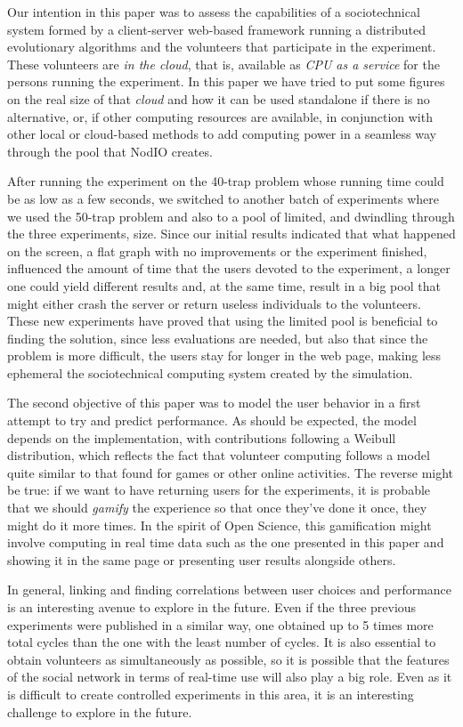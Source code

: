 \documentclass[letterpaper]{article}
\begin{document}
Our intention in this paper was to assess the capabilities of a
sociotechnical system formed by a client-server web-based framework
running a distributed evolutionary algorithms and the volunteers that
participate in the experiment. These volunteers are {\em in the
  cloud}, that is, available as {\em CPU as a service} for the persons
running the experiment. In this paper we have tried to put some figures
on the real size of that {\em cloud} and how it can be used standalone
if there is no alternative, or, if other computing resources are
available, in conjunction with other local or cloud-based methods to
add computing power in a seamless way through the pool that NodIO creates. 

After running the experiment on the 40-trap problem whose running time
could be as low as a few seconds, we switched to another batch of
experiments where we used the 50-trap problem and also to a pool of
limited, and dwindling through the three experiments, size. Since our
initial results indicated that what happened on the screen, a flat
graph with no improvements or the experiment finished, influenced the
amount of time that the users devoted to the experiment, a longer one
could yield different results and, at the same time, result in a big
pool that might either crash the server or return useless individuals
to the volunteers. These new experiments have proved that using the
limited pool is beneficial to finding the solution, since less
evaluations are needed, but also that since the problem is more
difficult, the users stay for longer in the web page, making less
ephemeral the sociotechnical computing system created by the
simulation. 


The second objective of this paper was to model the user behavior in a
first attempt to try and predict performance. As should be expected,
the model depends on the implementation, with contributions following
a Weibull distribution, which reflects the fact
that volunteer computing follows a model quite similar to that found
for games or other online activities. The reverse might be true: if we
want to have returning users for the experiments, it is probable that
we should {\em gamify} the experience so that once they've done it
once, they might do it more times. In the spirit of Open Science, this
gamification might involve computing in real time data such as the one
presented in this paper and showing it in the same page or presenting
user results alongside others.

In general, linking and finding correlations between user choices and
performance is an interesting avenue to explore in the future. Even if
the three previous experiments were published in a similar way, one
obtained up to 5 times more total cycles  than the one with the least
number of cycles. It is also essential to obtain volunteers as
simultaneously as possible, so it is possible that the features of the
social network in terms of real-time use will also play a big
role. Even as it is difficult to create controlled experiments in this
area, it is an interesting challenge to explore in the future.
\end{document}
